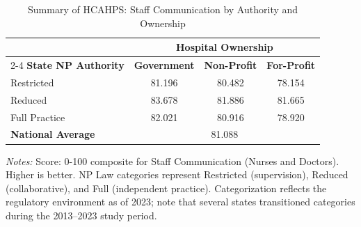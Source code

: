 \begin{table}[htbp]
    \centering
    \caption{Summary of HCAHPS: Staff Communication by Authority and Ownership}
    \label{tab:hcahps_grp1}
    \vspace{0.2cm}
    \begin{tabular}{lccc}
        \toprule
        & \multicolumn{3}{c}{\textbf{Hospital Ownership}} \\
        \cmidrule(lr){2-4}
        \textbf{State NP Authority} & \textbf{Government} & \textbf{Non-Profit} & \textbf{For-Profit} \\
        \midrule
        Restricted & 81.196 & 80.482 & 78.154 \\
        Reduced & 83.678 & 81.886 & 81.665 \\
        Full Practice & 82.021 & 80.916 & 78.920 \\
        \midrule
        \textbf{National Average} & \multicolumn{3}{c}{81.088} \\
        \bottomrule
    \end{tabular}
    \vspace{0.1cm}
    \begin{minipage}{0.85\textwidth}
        \footnotesize \textit{Notes:} Score: 0-100 composite for Staff Communication (Nurses and Doctors). Higher is better. NP Law categories represent Restricted (supervision), Reduced (collaborative), and Full (independent practice). Categorization reflects the regulatory environment as of 2023; note that several states transitioned categories during the 2013--2023 study period.
    \end{minipage}
\end{table}